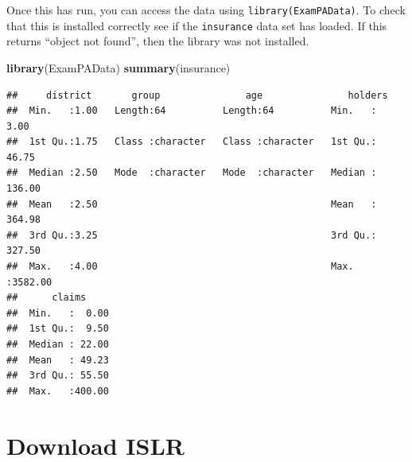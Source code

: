\documentclass[openany]{book}
\newenvironment{Shaded}{\begin{snugshade}}{\end{snugshade}}
\newcommand{\CommentTok}[1]{\textcolor[rgb]{0.56,0.35,0.01}{\textit{#1}}}
\newcommand{\ControlFlowTok}[1]{\textcolor[rgb]{0.13,0.29,0.53}{\textbf{#1}}}
\newcommand{\KeywordTok}[1]{\textcolor[rgb]{0.13,0.29,0.53}{\textbf{#1}}}
\newcommand{\NormalTok}[1]{#1}
\newcommand{\OperatorTok}[1]{\textcolor[rgb]{0.81,0.36,0.00}{\textbf{#1}}}
\newcommand{\StringTok}[1]{\textcolor[rgb]{0.31,0.60,0.02}{#1}}
\begin{document}
\begin{Shaded}
\end{Shaded}

Once this has run, you can access the data using \texttt{library(ExamPAData)}. To check that this is installed correctly see if the \texttt{insurance} data set has loaded. If this returns ``object not found'', then the library was not installed.

\begin{Shaded}
\begin{Highlighting}[]
\KeywordTok{library}\NormalTok{(ExamPAData)}
\KeywordTok{summary}\NormalTok{(insurance)}
\end{Highlighting}
\end{Shaded}

\begin{verbatim}
##     district       group               age               holders       
##  Min.   :1.00   Length:64          Length:64          Min.   :   3.00  
##  1st Qu.:1.75   Class :character   Class :character   1st Qu.:  46.75  
##  Median :2.50   Mode  :character   Mode  :character   Median : 136.00  
##  Mean   :2.50                                         Mean   : 364.98  
##  3rd Qu.:3.25                                         3rd Qu.: 327.50  
##  Max.   :4.00                                         Max.   :3582.00  
##      claims      
##  Min.   :  0.00  
##  1st Qu.:  9.50  
##  Median : 22.00  
##  Mean   : 49.23  
##  3rd Qu.: 55.50  
##  Max.   :400.00
\end{verbatim}

\hypertarget{download-islr}{%
\section{Download ISLR}\label{download-islr}}
\end{document}
